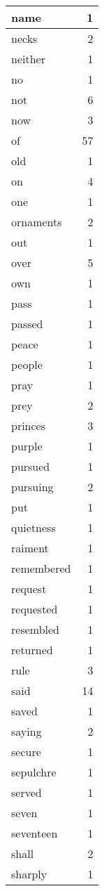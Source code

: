 \begin{center}
\begin{longtable}{l|r}
name & 1\\ \hline 
necks & 2\\ \hline 
neither & 1\\ \hline 
no & 1\\ \hline 
not & 6\\ \hline 
now & 3\\ \hline 
of & 57\\ \hline 
old & 1\\ \hline 
on & 4\\ \hline 
one & 1\\ \hline 
ornaments & 2\\ \hline 
out & 1\\ \hline 
over & 5\\ \hline 
own & 1\\ \hline 
pass & 1\\ \hline 
passed & 1\\ \hline 
peace & 1\\ \hline 
people & 1\\ \hline 
pray & 1\\ \hline 
prey & 2\\ \hline 
princes & 3\\ \hline 
purple & 1\\ \hline 
pursued & 1\\ \hline 
pursuing & 2\\ \hline 
put & 1\\ \hline 
quietness & 1\\ \hline 
raiment & 1\\ \hline 
remembered & 1\\ \hline 
request & 1\\ \hline 
requested & 1\\ \hline 
resembled & 1\\ \hline 
returned & 1\\ \hline 
rule & 3\\ \hline 
said & 14\\ \hline 
saved & 1\\ \hline 
saying & 2\\ \hline 
secure & 1\\ \hline 
sepulchre & 1\\ \hline 
served & 1\\ \hline 
seven & 1\\ \hline 
seventeen & 1\\ \hline 
shall & 2\\ \hline 
sharply & 1\\ \hline 

\end{longtable}
\end{center}
